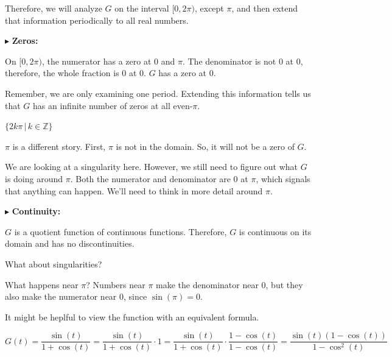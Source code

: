 \documentclass{ximera}
\begin{document}
Therefore, we will analyze $G$ on the interval $[0, 2\pi)$, except $\pi$, and then extend that information periodically to all real numbers.










$\blacktriangleright$ \textbf{\textcolor{blue!55!black}{Zeros: }}  


On $[0, 2\pi)$, the numerator has a zero at $0$ and $\pi$.   The denominator is not $0$ at $0$, therefore, the whole fraction is $0$ at $0$.  $G$ has a zero at $0$. 

Remember, we are only examining one period.  Extending this information tells us that $G$ has an infinite number of zeros at all even-$\pi$. 



$\{  2k \pi \, | \, k \in \mathbb{Z}   \}$





$\pi$ is a different story.  First, $\pi$ is not in the domain. So, it will not be a zero of $G$. 


We are looking at a singularity here. However, we still need to figure out what $G$ is doing around $\pi$. Both the numerator and denominator are $0$ at $\pi$, which signals that anything can happen.  We'll need to think in more detail around $\pi$.










$\blacktriangleright$ \textbf{\textcolor{blue!55!black}{Continuity: }}  


$G$ is a quotient function of continuous functions.  Therefore, $G$ is continuous on its domain and has no discontinuities. 

What about singularities? 






What happens near $\pi$?  Numbers near $\pi$ make the denominator near $0$, but they also make the numerator near $0$, since $\sin(\pi)=0$.

It might be heplful to view the function with an equivalent formula.


\[   G(t) = \frac{\sin(t)}{1 + \cos(t)}  = \frac{\sin(t)}{1 + \cos(t)}  \cdot 1 = \frac{\sin(t)}{1 + \cos(t)}  \cdot \frac{1-\cos(t)}{1-\cos(t)} = \frac{\sin(t) (1-\cos(t))}{1-\cos^2(t)}    \]
\end{document}
